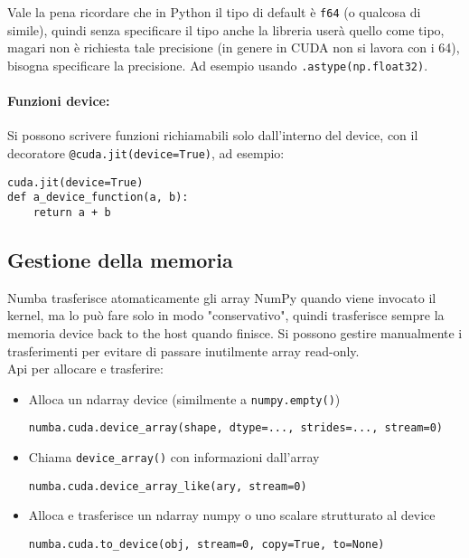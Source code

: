 Vale la pena ricordare che in Python il tipo di default è \texttt{f64} (o qualcosa di simile), quindi senza specificare il tipo anche la libreria userà quello come tipo, magari non è richiesta tale precisione (in genere in CUDA non si lavora con i 64), bisogna specificare la precisione. Ad esempio usando \texttt{.astype(np.float32)}.\\

\paragraph{Funzioni device:} Si possono scrivere funzioni richiamabili solo dall'interno del device, con il decoratore \texttt{@cuda.jit(device=True)}, ad esempio:
\begin{verbatim}
cuda.jit(device=True)
def a_device_function(a, b):
	return a + b
\end{verbatim}

\subsection{Gestione della memoria}

Numba trasferisce atomaticamente gli array NumPy quando viene invocato il kernel, ma lo può fare solo in modo "conservativo", quindi trasferisce sempre la memoria device back to the host quando finisce. Si possono gestire manualmente i trasferimenti per evitare di passare inutilmente array read-only.\\

Api per allocare e trasferire:
\begin{itemize}
	\item Alloca un ndarray device (similmente a \texttt{numpy.empty()})
	\begin{verbatim}
numba.cuda.device_array(shape, dtype=..., strides=..., stream=0)
	\end{verbatim}
	\item Chiama \texttt{device\_array()} con informazioni dall'array
	\begin{verbatim}
numba.cuda.device_array_like(ary, stream=0)
	\end{verbatim}
	\item Alloca e trasferisce un ndarray numpy o uno scalare strutturato al device
	\begin{verbatim}
numba.cuda.to_device(obj, stream=0, copy=True, to=None)
	\end{verbatim}
\end{itemize}

